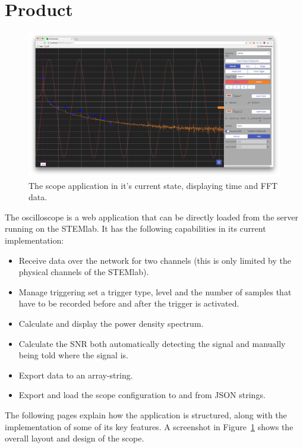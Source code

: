 %
%
\section{Product} %
\label{sec:gui:product}

\begin{figure}
    \centering
    \includegraphics[width=1\textwidth]{images/gui/scope}
    \caption[The scope application]{%
        The scope application in it's current state, displaying time and FFT data.%
    }
    \label{fig:gui:screenshot}
\end{figure}

The oscilloscope  is a web  application that can  be directly loaded  from the
server  running on  the  STEMlab. It  has the  following  capabilities in  its
current implementation:
\begin{itemize}\tightlist
    \item 
        Receive data over  the network for two channels (this  is only limited
        by the physical channels of the STEMlab).
    \item 
        Manage triggering set a trigger type,  level and the number of samples
        that have to be recorded before and after the trigger is activated.
    \item 
        Calculate and display the power density spectrum.
    \item 
        Calculate the SNR both automatically detecting the signal and manually
        being told where the signal is.
    \item 
        Export data to an array-string.
    \item 
        Export and load the scope configuration to and from JSON strings.
\end{itemize}
The  following  pages  explain  how   the  application  is  structured,  along
with  the  implementation  of  some  of  its  key  features. A  screenshot  in
Figure~\ref{fig:gui:screenshot}  shows the  overall layout  and design  of the
scope.


